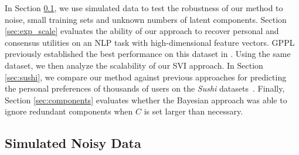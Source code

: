 In Section \ref{sec:exp_synth}, we use simulated data to test the robustness of our method to noise, small training sets and unknown numbers of latent components.
Section \ref{sec:exp_scale} evaluates the ability of our approach to
recover personal and consensus utilities on an NLP task with high-dimensional feature vectors.
GPPL previously established the best performance on this dataset in \citet{simpson2018finding}.
Using the same dataset, we then analyze the scalability of our SVI approach. 
In Section \ref{sec:sushi}, 
we compare our method against previous approaches for predicting the 
personal preferences of thousands of users on the \emph{Sushi} datasets~\citep{kamishima2003nantonac}.
Finally, Section \ref{sec:components} evaluates whether the Bayesian approach was able to ignore redundant
components when $C$ is set larger than necessary.




\subsection{Simulated Noisy Data}\label{sec:exp_synth}

